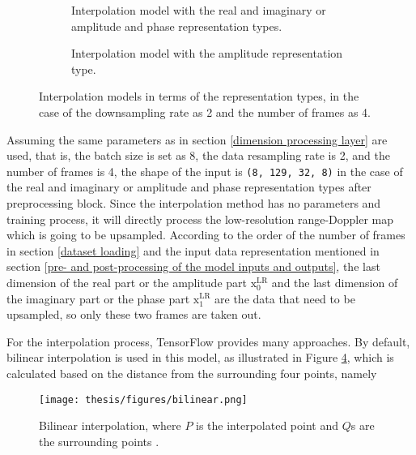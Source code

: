 \begin{figure}
    \centering
    \hspace{-0.4cm}
    \begin{subfigure}{0.59\textwidth}
        \centering
        \caption{Interpolation model with the real and imaginary or amplitude and phase representation types.}
        \label{interpolation model left}
    \end{subfigure}
    \begin{subfigure}{0.39\textwidth}
        \centering
        \caption{Interpolation model with the amplitude representation type.}
        \label{interpolation model right}
    \end{subfigure}
    \caption{Interpolation models in terms of the representation types, in the case of the downsampling rate as 2 and the number of frames as 4.}
	\label{interpolation model}
\end{figure}

Assuming the same parameters as in section \ref{dimension processing layer} are used, that is, the batch size is set as 8, the data resampling rate is 2, and the number of frames is 4, the shape of the input is \texttt{(8, 129, 32, 8)} in the case of the real and imaginary or amplitude and phase representation types after preprocessing block. Since the interpolation method has no parameters and training process, it will directly process the low-resolution range-Doppler map which is going to be upsampled. According to the order of the number of frames in section \ref{dataset loading} and the input data representation mentioned in section \ref{pre- and post-processing of the model inputs and outputs}, the last dimension of the real part or the amplitude part $\text{x}^{\text{LR}}_0$ and the last dimension of the imaginary part or the phase part $\text{x}^{\text{LR}}_1$ are the data that need to be upsampled, so only these two frames are taken out.

For the interpolation process, TensorFlow provides many approaches. By default, bilinear interpolation is used in this model, as illustrated in Figure \ref{bilinear interpolation}, which is calculated based on the distance from the surrounding four points, namely
\begin{figure}
	\centering
	\texttt{[image: thesis/figures/bilinear.png]}
	\caption{Bilinear interpolation, where $P$ is the interpolated point and $Q$s are the surrounding points \cite{noauthor_bilinear_2025}.}
	\label{bilinear interpolation}
\end{figure}

